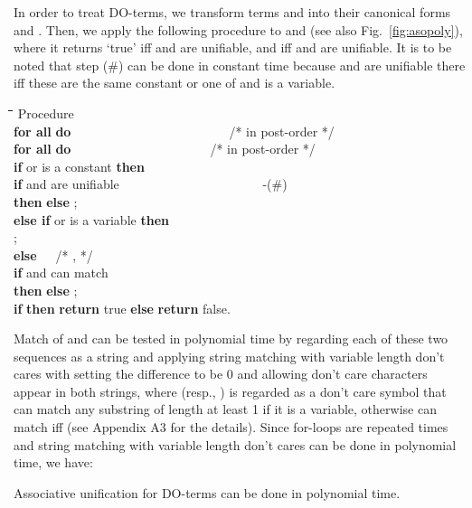 \documentclass[a4paper]{llncs}
\begin{document}
In order to treat DO-terms,
we transform terms  and  into their canonical forms  and .
Then, we apply the following procedure to  and 
(see also Fig.~\ref{fig:asopoly}),
where it returns `true' iff  and  are unifiable, and
 iff  and  are unifiable.
It is to be noted that step (\#) can be done in constant time because
 and  are unifiable there iff
these are the same constant or one of  and  is a variable.

\begin{rm}
\begin{tabbing}
\quad \= \quad \= \quad \= \quad \= \quad \= \quad \= \quad \= \kill
\> Procedure \\
\> \> {\bf for all}  {\bf do}~~~~~~~~~~~~~~~~~~~~~~~~~/* in post-order */ \\
\> \> \> {\bf for all}  {\bf do}~~~~~~~~~~~~~~~~~~~~~~/* in post-order */ \\
\> \> \> \> {\bf if}  or  is a constant {\bf then}\\
\> \> \> \> \> {\bf if}  and  are unifiable ~~~~~~~~~~~~~~~~~~~~~~-(\#) \\
\> \> \> \> \> {\bf then}  {\bf else} 
;\\
\> \> \> \> {\bf else if}  or  is a variable {\bf then}\\
\> \> \> \> \> ;\\
\> \> \> \> {\bf else}~~~/* ,
 */\\
\> \> \> \> \> {\bf if}  and 
 can match   \\
\> \> \> \> \> {\bf then}  {\bf else} ; \\
\> \> {\bf if} 
{\bf then} {\bf return} true {\bf else} {\bf return} false.
\end{tabbing}
\end{rm}

Match of  
and  can be tested in
polynomial time by regarding each of these two sequences as a string
and applying string matching with variable length don't cares
\cite{akutsu96} with setting the difference to be 0 and allowing don't
care characters appear in both strings,
where
 (resp., ) is regarded as a don't care symbol
that can match any substring of length at least 1 if it is a variable,
otherwise  can match  iff 
(see Appendix A3 for the details).
Since for-loops are repeated  times and
string matching with variable length don't cares can be done in polynomial time,
we have:

\begin{theorem}
Associative unification for DO-terms can be done in polynomial time.
\label{thm:asspoly}
\end{theorem}
\end{document}
